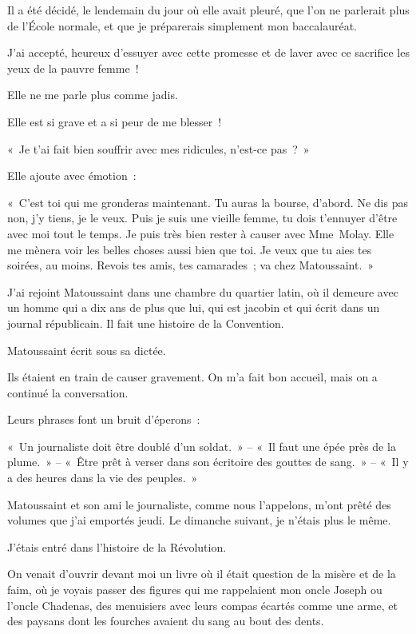\documentclass[french,twoside]{book} %
\begin{document}
\bigbreak
\noindent Il a été décidé, le lendemain du jour où elle avait pleuré, que l’on ne parlerait plus de l’École normale, et que je préparerais simplement mon baccalauréat.\par
J’ai accepté, heureux d’essuyer avec cette promesse et de laver avec ce sacrifice les yeux de la pauvre femme !\par
Elle ne me parle plus comme jadis.\par
Elle est si grave et a si peur de me blesser !\par
« Je t’ai fait bien souffrir avec mes ridicules, n’est-ce pas ? »\par
Elle ajoute avec émotion :\par
« C’est toi qui me gronderas maintenant. Tu auras la bourse, d’abord. Ne dis pas non, j’y tiens, je le veux. Puis je suis une vieille femme, tu dois t’ennuyer d’être avec moi tout le temps. Je puis très bien rester à causer avec Mme Molay. Elle me mènera voir les belles choses aussi bien que toi. Je veux que tu aies tes soirées, au moins. Revois tes amis, tes camarades ; va chez Matoussaint. »\par
\bigbreak
\noindent J’ai rejoint Matoussaint dans une chambre du quartier latin, où il demeure avec un homme qui a dix ans de plus que lui, qui est jacobin et qui écrit dans un journal républicain. Il fait une histoire de la Convention.\par
Matoussaint écrit sous sa dictée.\par
Ils étaient en train de causer gravement. On m’a fait bon accueil, mais on a continué la conversation.\par
Leurs phrases font un bruit d’éperons :\par
« Un journaliste doit être doublé d’un soldat. » – « Il faut une épée près de la plume. » – « Être prêt à verser dans son écritoire des gouttes de sang. » – « Il y a des heures dans la vie des peuples. »\par
Matoussaint et son ami le journaliste, comme nous l’appelons, m’ont prêté des volumes que j’ai emportés jeudi. Le dimanche suivant, je n’étais plus le même.\par
\bigbreak
\noindent J’étais entré dans l’histoire de la Révolution.\par
On venait d’ouvrir devant moi un livre où il était question de la misère et de la faim, où je voyais passer des figures qui me rappelaient mon oncle Joseph ou l’oncle Chadenas, des menuisiers avec leurs compas écartés comme une arme, et des paysans dont les fourches avaient du sang au bout des dents.\par
\end{document}
